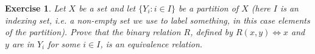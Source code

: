 \documentclass{article}
\theoremstyle{plain}
\newtheorem{Q}{Exercise}{\bfseries}{\upshape}
\begin{document}
\begin{Q}\label{\prefix Q:equiv}
Let $X$ be a set and let $\{Y_i: i\in I\}$ be a partition of $X$ (here $I$ is an \emph{indexing set}, i.e. a non-empty set we use to label something, in this case elements of the partition). Prove that the binary relation $R$, defined by $R(x,y)\iff x$ and $y$ are in $Y_i$ for some $i\in I$, is an equivalence relation.
\end{Q}
\begin{comment}
\textbf{Solution:}
We must show that this relation $R$ satisfies the three conditions of equivalence relations. 
\begin{enumerate}[1.]
\item First we need to show that $R$ is reflexive. So, given $x\in X$, is it true that $R(x,x)$? Yes, because obviously $x$ is in the same part of the partition as itself.
\item Now we need to show that $R$ is symmetric. So, suppose $R(x,y)$. Then $x$ and $y$ are in the same part of the partition. But then $R(y,x)$ by definition.
\item Finally, we show $R$ is transitive. Suppose $R(x,y)$ and $R(y,z)$. Then $x$ is in the same part of the partition as $y$, and $y$ is in the same part of the partition as $z$. But this means $x$ is in the same part of the partition as $z$, and so $R(x,z)$, which is what we want.
\end{enumerate}
\end{comment}
\end{document}
